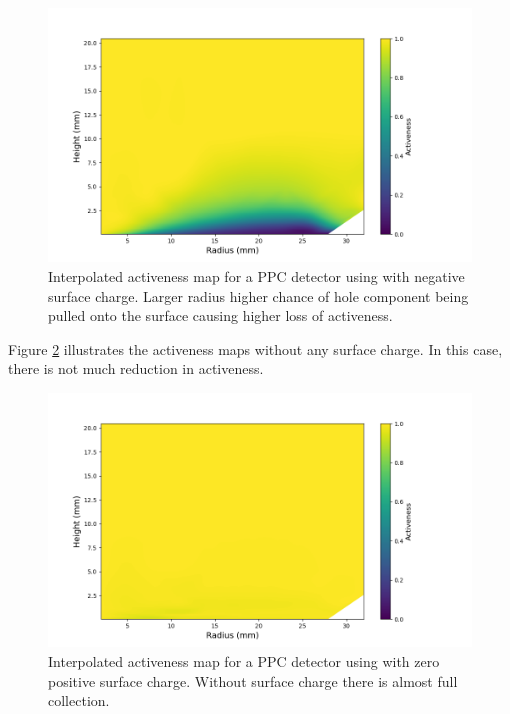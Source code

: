 \begin{figure}%
\centering
\includegraphics[trim={1.4cm 0.5cm 3.2cm 1.755cm},clip,width=0.95\linewidth]{ch5/figs/activeness_map_cubic_sc=-0.3_ponama_1_5000.png}

\caption{Interpolated activeness map for a PPC detector using \ehd with negative surface charge. Larger radius higher chance of hole component being pulled onto the surface causing higher loss of activeness.}
\label{ch5_fig_activeness_map_neg}
\end{figure}

Figure \ref{ch5_fig_interpolated_activeness_map_0} illustrates the activeness maps without any surface charge. In this case, there is not much reduction in activeness. 

\begin{figure}%
\centering
\includegraphics[trim={1.5cm 0cm 3.3cm 1cm},clip,width=0.95\linewidth]{ch5/figs/activeness_map_cubic_sc=0.0_ponama_1_5000.png}
\caption{Interpolated activeness map for a PPC detector using \ehd with zero positive surface charge. Without surface charge there is almost full collection.}
\label{ch5_fig_interpolated_activeness_map_0}
\end{figure}

